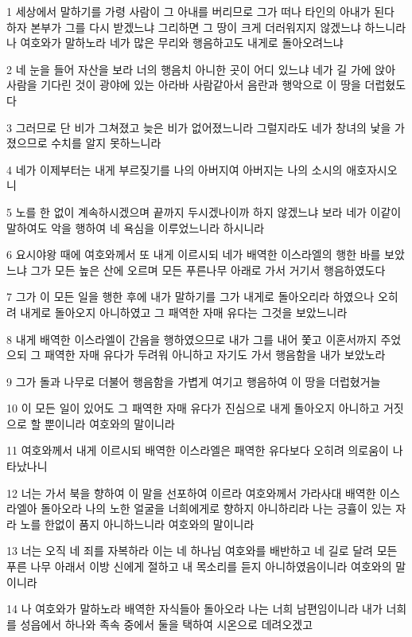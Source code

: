 \par 1 세상에서 말하기를 가령 사람이 그 아내를 버리므로 그가 떠나 타인의 아내가 된다 하자 본부가 그를 다시 받겠느냐 그리하면 그 땅이 크게 더러워지지 않겠느냐 하느니라 나 여호와가 말하노라 네가 많은 무리와 행음하고도 내게로 돌아오려느냐
\par 2 네 눈을 들어 자산을 보라 너의 행음치 아니한 곳이 어디 있느냐 네가 길 가에 앉아 사람을 기다린 것이 광야에 있는 아라바 사람같아서 음란과 행악으로 이 땅을 더럽혔도다
\par 3 그러므로 단 비가 그쳐졌고 늦은 비가 없어졌느니라 그럴지라도 네가 창녀의 낯을 가졌으므로 수치를 알지 못하느니라
\par 4 네가 이제부터는 내게 부르짖기를 나의 아버지여 아버지는 나의 소시의 애호자시오니
\par 5 노를 한 없이 계속하시겠으며 끝까지 두시겠나이까 하지 않겠느냐 보라 네가 이같이 말하여도 악을 행하여 네 욕심을 이루었느니라 하시니라
\par 6 요시야왕 때에 여호와께서 또 내게 이르시되 네가 배역한 이스라엘의 행한 바를 보았느냐 그가 모든 높은 산에 오르며 모든 푸른나무 아래로 가서 거기서 행음하였도다
\par 7 그가 이 모든 일을 행한 후에 내가 말하기를 그가 내게로 돌아오리라 하였으나 오히려 내게로 돌아오지 아니하였고 그 패역한 자매 유다는 그것을 보았느니라
\par 8 내게 배역한 이스라엘이 간음을 행하였으므로 내가 그를 내어 쫓고 이혼서까지 주었으되 그 패역한 자매 유다가 두려워 아니하고 자기도 가서 행음함을 내가 보았노라
\par 9 그가 돌과 나무로 더불어 행음함을 가볍게 여기고 행음하여 이 땅을 더럽혔거늘
\par 10 이 모든 일이 있어도 그 패역한 자매 유다가 진심으로 내게 돌아오지 아니하고 거짓으로 할 뿐이니라 여호와의 말이니라
\par 11 여호와께서 내게 이르시되 배역한 이스라엘은 패역한 유다보다 오히려 의로움이 나타났나니
\par 12 너는 가서 북을 향하여 이 말을 선포하여 이르라 여호와께서 가라사대 배역한 이스라엘아 돌아오라 나의 노한 얼굴을 너희에게로 향하지 아니하리라 나는 긍휼이 있는 자라 노를 한없이 품지 아니하느니라 여호와의 말이니라
\par 13 너는 오직 네 죄를 자복하라 이는 네 하나님 여호와를 배반하고 네 길로 달려 모든 푸른 나무 아래서 이방 신에게 절하고 내 목소리를 듣지 아니하였음이니라 여호와의 말이니라
\par 14 나 여호와가 말하노라 배역한 자식들아 돌아오라 나는 너희 남편임이니라 내가 너희를 성읍에서 하나와 족속 중에서 둘을 택하여 시온으로 데려오겠고

